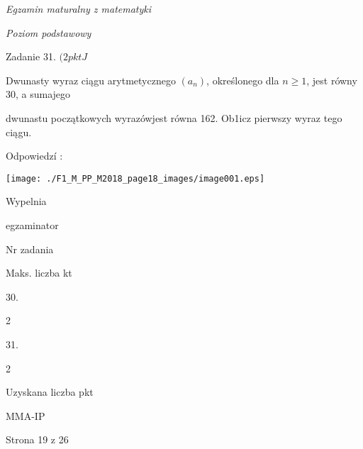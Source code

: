 \documentclass[a4paper,12pt]{article}
\begin{document}
{\it Egzamin maturalny z matematyki}

{\it Poziom podstawowy}

Zadanie 31. $(2pktJ$

Dwunasty wyraz ciągu arytmetycznego $(a_{n})$, określonego dla $n\geq 1$, jest równy 30, a sumajego

dwunastu początkowych wyrazówjest równa 162. Ob1icz pierwszy wyraz tego ciągu.

Odpowiedzí :
\begin{center}
\texttt{[image: ./F1\_M\_PP\_M2018\_page18\_images/image001.eps]}
\end{center}
Wypelnia

egzaminator

Nr zadania

Maks. liczba kt

30.

2

31.

2

Uzyskana liczba pkt

MMA-IP

Strona 19 z 26
\end{document}

